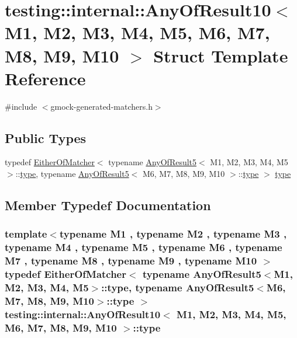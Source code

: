 \hypertarget{structtesting_1_1internal_1_1_any_of_result10}{}\section{testing\+:\+:internal\+:\+:Any\+Of\+Result10$<$ M1, M2, M3, M4, M5, M6, M7, M8, M9, M10 $>$ Struct Template Reference}
\label{structtesting_1_1internal_1_1_any_of_result10}


{\ttfamily \#include $<$gmock-\/generated-\/matchers.\+h$>$}

\subsection*{Public Types}
\begin{DoxyCompactItemize}
\item 
typedef \hyperlink{classtesting_1_1internal_1_1_either_of_matcher}{Either\+Of\+Matcher}$<$ typename \hyperlink{structtesting_1_1internal_1_1_any_of_result5}{Any\+Of\+Result5}$<$ M1, M2, M3, M4, M5 $>$\+::\hyperlink{structtesting_1_1internal_1_1_any_of_result10_aa1cb3d733f29716f2015db8a2b6c1c94}{type}, typename \hyperlink{structtesting_1_1internal_1_1_any_of_result5}{Any\+Of\+Result5}$<$ M6, M7, M8, M9, M10 $>$\+::\hyperlink{structtesting_1_1internal_1_1_any_of_result10_aa1cb3d733f29716f2015db8a2b6c1c94}{type} $>$ \hyperlink{structtesting_1_1internal_1_1_any_of_result10_aa1cb3d733f29716f2015db8a2b6c1c94}{type}
\end{DoxyCompactItemize}


\subsection{Member Typedef Documentation}
\subsubsection[{\texorpdfstring{type}{type}}]{\setlength{\rightskip}{0pt plus 5cm}template$<$typename M1 , typename M2 , typename M3 , typename M4 , typename M5 , typename M6 , typename M7 , typename M8 , typename M9 , typename M10 $>$ typedef {\bf Either\+Of\+Matcher}$<$ typename {\bf Any\+Of\+Result5}$<$M1, M2, M3, M4, M5$>$\+::{\bf type}, typename {\bf Any\+Of\+Result5}$<$M6, M7, M8, M9, M10$>$\+::{\bf type} $>$ {\bf testing\+::internal\+::\+Any\+Of\+Result10}$<$ M1, M2, M3, M4, M5, M6, M7, M8, M9, M10 $>$\+::{\bf type}}\hypertarget{structtesting_1_1internal_1_1_any_of_result10_aa1cb3d733f29716f2015db8a2b6c1c94}{}\label{structtesting_1_1internal_1_1_any_of_result10_aa1cb3d733f29716f2015db8a2b6c1c94}


